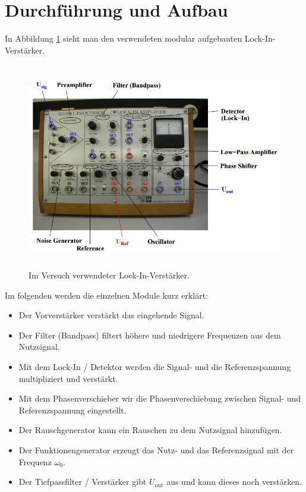 \section{Durchführung und Aufbau}
\label{sec:Durchführung}

In Abbildung \ref{img:LIV} sieht man den verwendeten modular aufgebauten Lock-In-Verstärker.
\begin{figure}[H]
	\centering
	\includegraphics[height=9cm]{picture/LIV.png}
	\caption{Im Versuch verwendeter Lock-In-Verstärker. \cite[3]{sample}}
  \label{img:LIV}
\end{figure}
Im folgenden werden die einzelnen Module kurz erklärt:
\begin{itemize}
	\item Der Vorverstärker verstärkt das eingehende Signal.
	\item Der Filter (Bandpass) filtert höhere und niedrigere Frequenzen aus dem Nutzsignal.
	\item Mit dem Lock-In / Detektor werden die Signal- und die Referenzspannung multipliziert und verstärkt.
	\item Mit dem Phasenverschieber wir die Phasenverschiebung zwischen Signal- und Referenzspannung eingestellt.
	\item Der Rauschgenerator kann ein Rauschen zu dem Nutzsignal hinzufügen.
	\item Der Funktionengenerator erzeugt das Nutz- und das Referenzsignal mit der Frequenz $\omega_0$.
	\item Der Tiefpassfilter / Verstärker gibt $U_\text{out}$ aus und kann dieses noch verstärken.
\end{itemize}
\newpage

